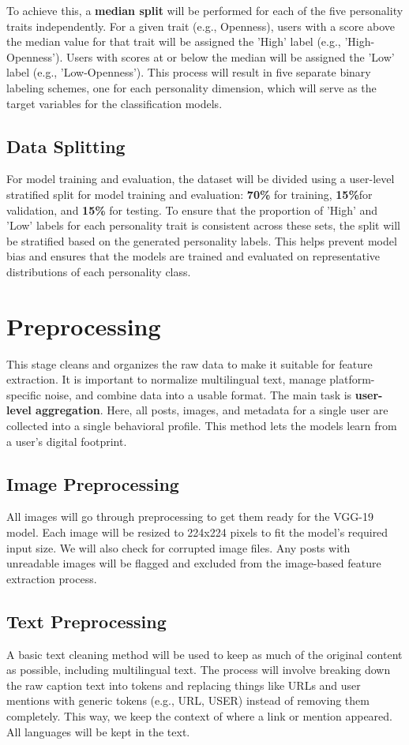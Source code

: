 To achieve this, a \textbf{median split} will be performed for each of the five personality traits independently. For a given trait (e.g., Openness), users with a score above the median value for that trait will be assigned the 'High' label (e.g., 'High-Openness'). Users with scores at or below the median will be assigned the 'Low' label (e.g., 'Low-Openness'). This process will result in five separate binary labeling schemes, one for each personality dimension, which will serve as the target variables for the classification models.

\subsection{Data Splitting}
For model training and evaluation, the dataset will be divided using a user-level stratified split for model training and evaluation: \textbf{70\%} for training, \textbf{15\%}for validation, and \textbf{15\%} for testing. To ensure that the proportion of 'High' and 'Low' labels for each personality trait is consistent across these sets, the split will be stratified based on the generated personality labels. This helps prevent model bias and ensures that the models are trained and evaluated on representative distributions of each personality class.

\section{Preprocessing}
This stage cleans and organizes the raw data to make it suitable for feature extraction. It is important to normalize multilingual text, manage platform-specific noise, and combine data into a usable format. The main task is \textbf{user-level aggregation}. Here, all posts, images, and metadata for a single user are collected into a single behavioral profile. This method lets the models learn from a user's digital footprint.

\subsection{Image Preprocessing}
All images will go through preprocessing to get them ready for the VGG-19 model. Each image will be resized to 224x224 pixels to fit the model’s required input size. We will also check for corrupted image files. Any posts with unreadable images will be flagged and excluded from the image-based feature extraction process.  

\subsection{Text Preprocessing}
A basic text cleaning method will be used to keep as much of the original content as possible, including multilingual text. The process will involve breaking down the raw caption text into tokens and replacing things like URLs and user mentions with generic tokens (e.g., URL, USER) instead of removing them completely. This way, we keep the context of where a link or mention appeared. All languages will be kept in the text.



